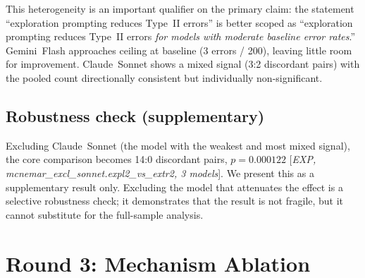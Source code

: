 \documentclass[11pt,a4paper]{article}
\begin{document}
\begin{table}[htbp]
\centering
\caption{Per-model McNemar tests, \textsf{expl2} vs.\ \textsf{extr2} (EXP).
  [\emph{Source: EXP = calculations-expanded.json,
  per\_model\_mcnemar section, $N_\text{eff} = 200$ per model}]}
\label{tab:permodel}
\smallskip
{}
\end{table}

This heterogeneity is an important qualifier on the primary claim: the
statement ``exploration prompting reduces Type~II errors'' is better scoped
as ``exploration prompting reduces Type~II errors \emph{for models with
moderate baseline error rates}.''  Gemini~Flash approaches ceiling at
baseline (3 errors / 200), leaving little room for improvement.
Claude~Sonnet shows a mixed signal (3:2 discordant pairs) with the pooled
count directionally consistent but individually non-significant.

\subsection{Robustness check (supplementary)}

Excluding Claude~Sonnet (the model with the weakest and most mixed signal),
the core comparison becomes 14:0 discordant pairs, $p = 0.000122$
[\emph{EXP, mcnemar\_excl\_sonnet.expl2\_vs\_extr2, 3 models}].
We present this as a supplementary result only.  Excluding the model that
attenuates the effect is a selective robustness check; it demonstrates
that the result is not fragile, but it cannot substitute for the
full-sample analysis.

\section{Round 3: Mechanism Ablation}
\label{sec:r3}
\end{document}
